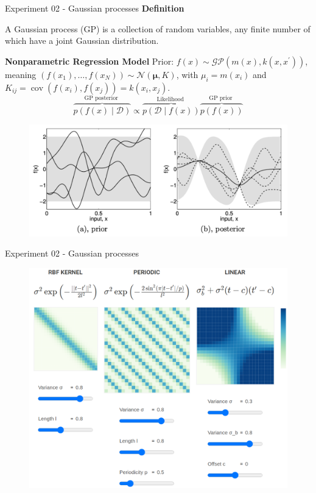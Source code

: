 \begin{frame}{Experiment 02 - Gaussian processes}
\textbf{\large Definition}

A Gaussian process (GP) is a collection of random variables, any finite number of which have a joint Gaussian distribution.

\textbf{\large Nonparametric Regression Model}
Prior: $f(x) \sim \mathcal{G P}\left(m(x), k\left(x, x^{\prime}\right)\right)$, meaning $\left(f\left(x_{1}\right), \ldots, f\left(x_{N}\right)\right) \sim \mathcal{N}(\boldsymbol{\mu}, K)$, with $\mu_{i}=m\left(x_{i}\right)$ and $K_{i j}=\operatorname{cov}\left(f\left(x_{i}\right), f\left(x_{j}\right)\right)=k\left(x_{i}, x_{j}\right)$.
$$
\overbrace{p(f(x) \mid \mathcal{D})}^{\text {GP posterior }} \propto \overbrace{p(\mathcal{D} \mid f(x))}^{\text {Likelihood }} \overbrace{p(f(x))}^{\text {GP prior }}
$$
	
\begin{figure}
	\centering
	\includegraphics[width=0.75\linewidth]{images/gp01}
	\caption{}
	\label{fig:gp01}
\end{figure}
\end{frame}


\begin{frame}{Experiment 02 - Gaussian processes}
\begin{figure}
	\centering
	\includegraphics[width=0.75\linewidth]{images/gp02}
	\caption{}
	\label{fig:gp01}
\end{figure}
\end{frame}



